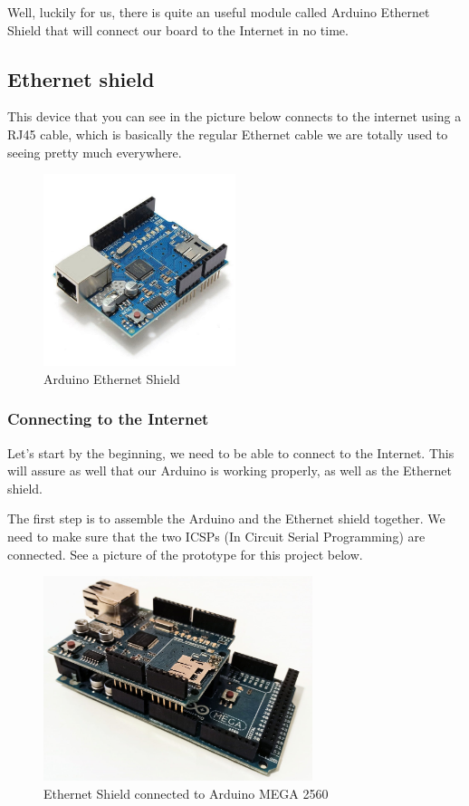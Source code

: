 Well, luckily for us, there is quite an useful module called Arduino Ethernet Shield that will connect our board to the Internet in no time.

\subsection{Ethernet shield}
This device that you can see in the picture below connects to the internet using a RJ45 cable, which is basically the regular Ethernet cable we are totally used to seeing pretty much everywhere.

\begin{figure}[H]
    \centering
    \includegraphics[width=0.5\textwidth]{fig/ethernet.jpg}
    \caption{Arduino Ethernet Shield}
    \label{fig:ethernet}
\end{figure}

\subsubsection{Connecting to the Internet}
Let's start by the beginning, we need to be able to connect to the Internet. This will assure as well that our Arduino is working properly, as well as the Ethernet shield.

The first step is to assemble the Arduino and the Ethernet shield together. We need to make sure that the two ICSPs (In Circuit Serial Programming) are connected. See a picture of the prototype for this project below.

\begin{figure}[H]
    \centering
    \includegraphics[width=0.7\textwidth]{fig/ethernet-connected.jpg}
    \caption{Ethernet Shield connected to Arduino MEGA 2560}
    \label{fig:ethernet-connected}
\end{figure}

